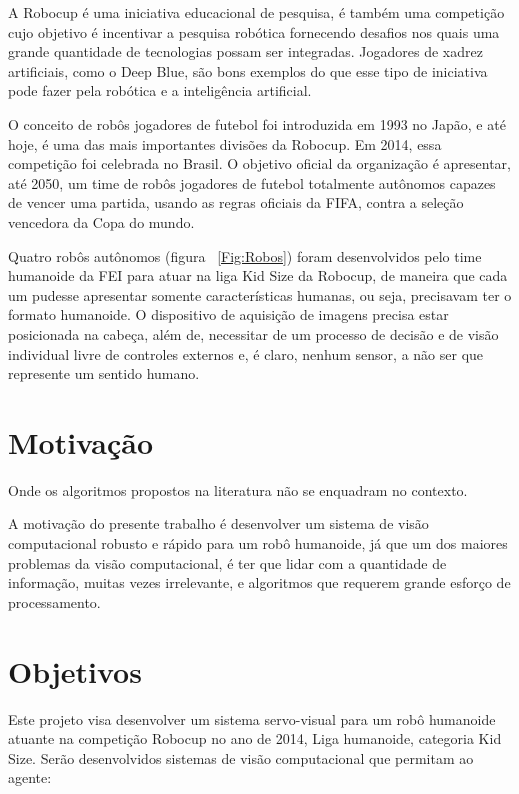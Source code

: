
A Robocup é uma iniciativa educacional de pesquisa, é também uma competição cujo objetivo é incentivar a pesquisa robótica fornecendo desafios nos quais uma grande quantidade de tecnologias possam ser integradas. Jogadores de xadrez artificiais, como o Deep Blue, são bons exemplos do que esse tipo de iniciativa pode fazer pela robótica e a inteligência artificial. 

O conceito de robôs jogadores de futebol foi introduzida em 1993 no Japão, e até hoje, é uma das mais importantes divisões da Robocup. Em 2014, essa competição foi celebrada no Brasil. O objetivo oficial da organização é apresentar, até 2050, um time de robôs jogadores de futebol totalmente autônomos capazes de vencer uma partida, usando as regras oficiais da FIFA, contra a seleção vencedora da Copa do mundo. 

Quatro robôs autônomos (figura ~\ref{Fig:Robos}) foram desenvolvidos pelo time humanoide da FEI para atuar na liga Kid Size da Robocup, de maneira que cada um pudesse apresentar somente características humanas, ou seja, precisavam ter o formato humanoide. O dispositivo de aquisição de imagens precisa estar posicionada na cabeça, além de, necessitar de um processo de decisão e de visão individual livre de controles externos e, é claro, nenhum sensor, a não ser que represente um sentido humano. 



\section{Motivação}

Onde os algoritmos propostos na literatura não se enquadram no contexto. 

A motivação do presente trabalho é desenvolver um sistema de visão computacional robusto e rápido para um robô humanoide, já que um dos maiores problemas da visão computacional, é ter que lidar com a quantidade de informação, muitas vezes irrelevante, e algoritmos que requerem grande esforço de processamento.  





\section{Objetivos}

Este projeto visa desenvolver um sistema servo-visual para um robô humanoide atuante na competição Robocup no ano de 2014, Liga humanoide, categoria Kid Size. Serão desenvolvidos sistemas de visão computacional que permitam ao agente:\\

